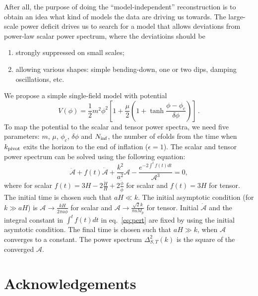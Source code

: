\documentclass[11pt]{article}
\begin{document}
After all, the purpose of doing the ``model-independent'' reconstruction is to obtain an idea what kind of models the data are driving us towards. The large-scale power deficit drives us to search for a model that allows deviations from power-law scalar power spectrum, where the deviatioins should be
\begin{enumerate}
\item{strongly suppressed on small scales;}
\item{allowing various shapes: simple bending-down, one or two dips, damping oscillations, etc.}
\end{enumerate}
We propose a simple single-field model with potential
\begin{equation}
V(\phi) = \frac{1}{2}m^2\phi^2\left[1 + \frac{\mu}{2} (1 + \tanh{\frac{\phi - \phi_c}{\delta\phi}}) \right] \,.
\end{equation}
To map the potential to the scalar and tensor power spectra, we need five parameters: $m$, $\mu$, $\phi_c$, $\delta\phi$ and $N_{\rm inf}$, the number of efolds from the time when $k_{\rm pivot}$ exits the horizon to the end of inflation ($\epsilon = 1$). The scalar and tensor power spectrum can be solved using the following equation:
\begin{equation}
  \ddot{\mathcal{A}} + f(t) \dot{\mathcal{A}} + \frac{k^2}{a^2} \mathcal{A} - \frac{e^{-2\int^t f(t) dt}}{\mathcal{A}^3}  = 0, \label{eq:pert}
\end{equation}
where for scalar $f(t) = 3 H - 2 \frac{\dot H}{H} + 2 \frac{\ddot\phi}{\dot\phi}$ for scalar and $f(t) = 3H$ for tensor. The initial time is chosen such that $aH\ll k$. The initial asymptotic condition (for $k\gg aH$) is $\mathcal{A} \rightarrow \frac{k H }{2\pi a\dot\phi}$ for scalar and $\mathcal{A} \rightarrow \frac{\sqrt{2}k}{\pi a M_p}$ for tensor.  Initial $\dot{\mathcal{A}}$ and the integral constant in $\int^t f(t) dt$ in eq.~\eqref{eq:pert} are fixed by using the initial asymtotic condition.  The final time is chosen such that $aH\gg k$, when $\mathcal{A}$ converges to a constant.  The power spectrum $\Delta^2_{S,T}(k)$ is the square of the converged $\mathcal{A}$.

\section*{Acknowledgements}


  

\end{document}
